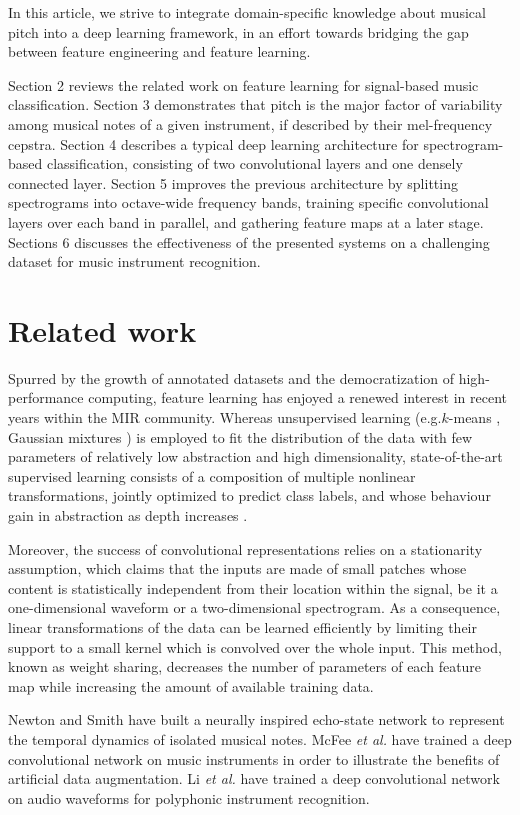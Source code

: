 \documentclass{article}
\makeatletter
\newcommand*{\eg}{e.g.\@\xspace}
\newcommand*{\etal}{\emph{et al.}\@\xspace}
\makeatother
\begin{document}
In this article, we strive to integrate domain-specific knowledge about musical
pitch into a deep learning framework, in an effort towards bridging the gap
between feature engineering and feature learning.

Section 2 reviews the related work on feature learning for signal-based music
classification.
Section 3 demonstrates that pitch is the major factor of variability among musical
notes of a given instrument, if described by their mel-frequency cepstra.
Section 4 describes a typical deep learning architecture for spectrogram-based
classification, consisting of two convolutional layers and one densely connected layer.
Section 5 improves the previous architecture by splitting spectrograms into
octave-wide frequency bands, training specific convolutional layers over each band
in parallel, and gathering feature maps at a later stage.
Sections 6 discusses the effectiveness of the presented systems on a challenging
dataset for music instrument recognition.

\section{Related work}
Spurred by the growth of annotated datasets and the democratization of
high-performance computing, feature learning has enjoyed a renewed interest
in recent years within the MIR community.
Whereas unsupervised learning (\eg $k$-means \cite{Stowell2014}, Gaussian
mixtures \cite{Joder2009}) is employed to fit the distribution of the data with
few parameters of relatively low abstraction
and high dimensionality, state-of-the-art supervised learning consists of a
composition of multiple nonlinear transformations, jointly optimized
to predict class labels, and whose behaviour gain in abstraction as depth
increases \cite{vandenOord2013}.

Moreover, the success of convolutional representations relies on a
stationarity assumption, which claims that the inputs are made
of small patches whose content is statistically independent
from their location within the signal, be it a one-dimensional waveform or
a two-dimensional spectrogram.
As a consequence, linear transformations of the data can be learned efficiently
by limiting their support to a small kernel which is convolved over
the whole input.
This method, known as weight sharing, decreases the number of parameters
of each feature map while increasing the amount of available training data.

Newton and Smith \cite{Newton2012} have built a neurally inspired echo-state
network to represent the temporal dynamics of isolated musical notes.
McFee \etal \cite{McFee2015-muda} have trained a deep convolutional network on
music instruments in order to illustrate the benefits of
artificial data augmentation.
Li \etal \cite{Li2015} have trained a deep convolutional network on audio waveforms
for polyphonic instrument recognition.
\end{document}
